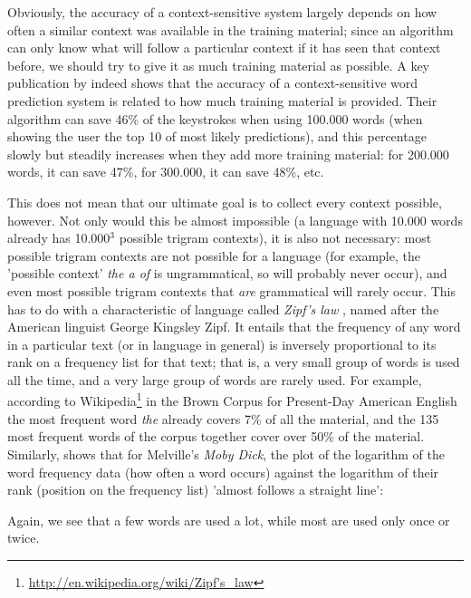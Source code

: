 \documentclass[12pt]{article}
\begin{document}
Obviously, the accuracy of a context-sensitive system largely depends on how often a similar context was available in the training material; since an algorithm can only know what will follow a particular context if it has seen that context before, we should try to give it as much training material as possible. A key publication by  indeed shows that the accuracy of a context-sensitive word prediction system is related to how much training material is provided. Their algorithm can save 46\% of the keystrokes when using 100.000 words (when showing the user the top 10 of most likely predictions), and this percentage slowly but steadily increases when they add more training material: for 200.000 words, it can save 47\%, for 300.000, it can save 48\%, etc.

This does not mean that our ultimate goal is to collect every context possible, however. Not only would this be almost impossible (a language with 10.000 words already has 10.000$^3$ possible trigram contexts), it is also not necessary: most possible trigram contexts are not possible for a language (for example, the 'possible context' \emph{the a of} is ungrammatical, so will probably never occur), and even most possible trigram contexts that \emph{are} grammatical will rarely occur. This has to do with a characteristic of language called \emph{Zipf's law} \cite{zipf65}, named after the American linguist George Kingsley Zipf. It entails that the frequency of any word in a particular text (or in language in general) is inversely proportional to its rank on a frequency list for that text; that is, a very small group of words is used all the time, and a very large group of words are rarely used. For example, according to Wikipedia\footnote{\url{http://en.wikipedia.org/wiki/Zipf's\_law}} in the Brown Corpus for Present-Day American English the most frequent word \emph{the} already covers 7\% of all the material, and the 135 most frequent words of the corpus together cover over 50\% of the material. Similarly,  shows that for Melville's \emph{Moby Dick}, the plot of the logarithm of the word frequency data (how often a word occurs)  against the logarithm of their rank (position on the frequency list) 'almost follows a straight line': 


Again, we see that a few words are used a lot, while most are used only once or twice.
\end{document}
